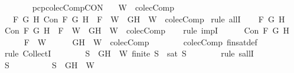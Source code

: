 \begin{isabellebody}
%
\endisatagproof
{\isafoldproof}%
%
\isadelimproof
\isanewline
%
\endisadelimproof
\ \ \ \ \ \ \isanewline
{}\isamarkupfalse%
\ pcp{\isacharunderscore}colecComp{\isacharunderscore}CON{\isacharcolon}\isanewline
\ \ \ {\isachardoublequoteopen}W\ {\isasymin}\ colecComp{\isachardoublequoteclose}\isanewline
\ \ \ {\isachardoublequoteopen}{\isasymforall}F\ G\ H{\isachardot}\ Con\ F\ G\ H\ {\isasymlongrightarrow}\ F\ {\isasymin}\ W\ {\isasymlongrightarrow}\ {\isacharbraceleft}G{\isacharcomma}H{\isacharbraceright}\ {\isasymunion}\ W\ {\isasymin}\ colecComp{\isachardoublequoteclose}\isanewline
%
\isadelimproof
%
\endisadelimproof
%
\isatagproof
{}\isamarkupfalse%
\ {\isacharparenleft}rule\ allI{\isacharparenright}{\isacharplus}\isanewline
\ \ \isamarkupfalse%
\ F\ G\ H\isanewline
\ \ \isamarkupfalse%
\ {\isachardoublequoteopen}Con\ F\ G\ H\ {\isasymlongrightarrow}\ F\ {\isasymin}\ W\ {\isasymlongrightarrow}\ {\isacharbraceleft}G{\isacharcomma}H{\isacharbraceright}\ {\isasymunion}\ W\ {\isasymin}\ colecComp{\isachardoublequoteclose}\isanewline
\ \ \isamarkupfalse%
\ {\isacharparenleft}rule\ impI{\isacharparenright}{\isacharplus}\isanewline
\ \ \ \ \isamarkupfalse%
\ {\isachardoublequoteopen}Con\ F\ G\ H{\isachardoublequoteclose}\isanewline
\ \ \ \ \isamarkupfalse%
\ {\isachardoublequoteopen}F\ {\isasymin}\ W{\isachardoublequoteclose}\isanewline
\ \ \ \ \isamarkupfalse%
\ {\isachardoublequoteopen}{\isacharbraceleft}G{\isacharcomma}H{\isacharbraceright}\ {\isasymunion}\ W\ {\isasymin}\ colecComp{\isachardoublequoteclose}\isanewline
\ \ \ \ \ \ \isamarkupfalse%
\ colecComp\ fin{\isacharunderscore}sat{\isacharunderscore}def\isanewline
\ \ \ \ \isamarkupfalse%
\ {\isacharparenleft}rule\ CollectI{\isacharparenright}\isanewline
\ \ \ \ \ \ \isamarkupfalse%
\ {\isachardoublequoteopen}{\isasymforall}S{\isacharprime}\ {\isasymsubseteq}\ {\isacharbraceleft}G{\isacharcomma}H{\isacharbraceright}\ {\isasymunion}\ W{\isachardot}\ finite\ S{\isacharprime}\ {\isasymlongrightarrow}\ sat\ S{\isacharprime}{\isachardoublequoteclose}\isanewline
\ \ \ \ \ \ \isamarkupfalse%
\ {\isacharparenleft}rule\ sallI{\isacharparenright}\isanewline
\ \ \ \ \ \ \ \ \isamarkupfalse%
\ S{\isacharprime}\isanewline
\ \ \ \ \ \ \ \ \isamarkupfalse%
\ {\isachardoublequoteopen}S{\isacharprime}\ {\isasymsubseteq}\ {\isacharbraceleft}G{\isacharcomma}H{\isacharbraceright}\ {\isasymunion}\ W{\isachardoublequoteclose}\isanewline

\end{isabellebody}
